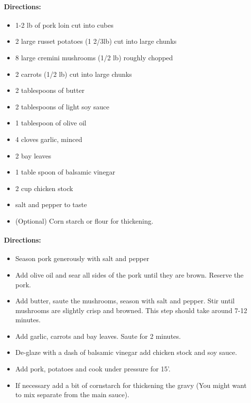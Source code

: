 \documentclass{article}
\begin{document}
\paragraph{Directions:}
\begin{itemize}
  \item	1-2 lb of pork loin cut into cubes
  \item 2 large russet potatoes (1 2/3lb) cut into large chunks
  \item 8 large cremini mushrooms (1/2 lb) roughly chopped
  \item 2 carrots (1/2 lb) cut into large chunks
  \item 2 tablespoons of butter
  \item 2 tablespoons of light soy sauce
  \item 1 tablespoon of olive oil
  \item 4 cloves garlic, minced
  \item 2 bay leaves
  \item 1 table spoon of balsamic vinegar
  \item 2 cup chicken stock
  \item salt and pepper to taste
  \item (Optional) Corn starch or flour for thickening.
\end{itemize}

\paragraph{Directions:}
\begin{itemize}
  \item Season pork generously with salt and pepper
  \item Add olive oil and sear all sides of the pork until they are brown. Reserve the pork.
  \item Add butter, saute the mushrooms, season with salt and pepper. Stir until mushrooms are slightly
crisp and browned. This step should take around 7-12 minutes.
  \item Add garlic, carrots and bay leaves. Saute for 2 minutes.
  \item De-glaze with a dash of balsamic vinegar add chicken stock and soy sauce.
  \item Add pork, potatoes and cook under pressure for 15’.
  \item If necessary add a bit of cornstarch for thickening the gravy (You might want to mix separate from the
main sauce).	
\end{itemize}
\end{document}
